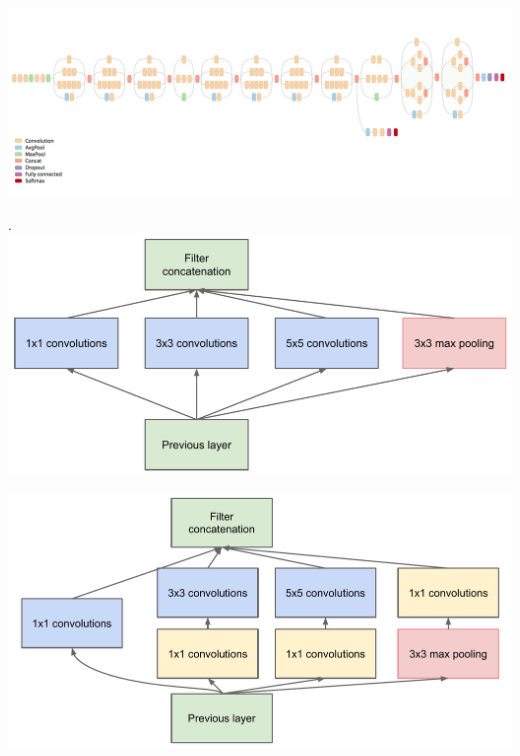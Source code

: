 \documentclass[11pt,oneside,a4paper]{article}
\newenvironment{Figure}
{\par\medskip\noindent\minipage{\linewidth}}
{\endminipage\par\medskip}
\begin{document}
\begin{Figure}
 \centering
 \includegraphics[width=1.\linewidth, height=0.26\linewidth]{inceptionv3_arch.png}
 \label{fig:inceptionv3_arch}
\end{Figure}

\begin{multicols}{2}
\begin{Figure}.
 \centering
 \includegraphics[width=\linewidth, height=0.5\linewidth]{inceptionnaive.pdf}
 \label{fig:inception_naive}
\end{Figure}
\begin{Figure}
 \centering
 \includegraphics[width=\linewidth, height=0.5\linewidth]{inceptionmodule.pdf}
 \label{fig:inception_arch}
\end{Figure}
\end{multicols}
\end{document}
